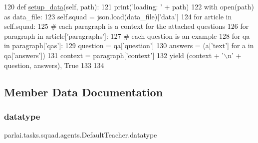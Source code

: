 \begin{DoxyCode}
120     \textcolor{keyword}{def }\hyperlink{namespaceparlai_1_1tasks_1_1multinli_1_1agents_a4fa2cb0ba1ed745336ad8bceed36b841}{setup\_data}(self, path):
121         print(\textcolor{stringliteral}{'loading: '} + path)
122         with open(path) \textcolor{keyword}{as} data\_file:
123             self.squad = json.load(data\_file)[\textcolor{stringliteral}{'data'}]
124         \textcolor{keywordflow}{for} article \textcolor{keywordflow}{in} self.squad:
125             \textcolor{comment}{# each paragraph is a context for the attached questions}
126             \textcolor{keywordflow}{for} paragraph \textcolor{keywordflow}{in} article[\textcolor{stringliteral}{'paragraphs'}]:
127                 \textcolor{comment}{# each question is an example}
128                 \textcolor{keywordflow}{for} qa \textcolor{keywordflow}{in} paragraph[\textcolor{stringliteral}{'qas'}]:
129                     question = qa[\textcolor{stringliteral}{'question'}]
130                     answers = (a[\textcolor{stringliteral}{'text'}] \textcolor{keywordflow}{for} a \textcolor{keywordflow}{in} qa[\textcolor{stringliteral}{'answers'}])
131                     context = paragraph[\textcolor{stringliteral}{'context'}]
132                     \textcolor{keywordflow}{yield} (context + \textcolor{stringliteral}{'\(\backslash\)n'} + question, answers), \textcolor{keyword}{True}
133 
134 
\end{DoxyCode}


\subsection{Member Data Documentation}
\mbox{\label{classparlai_1_1tasks_1_1squad_1_1agents_1_1DefaultTeacher_acad2f2d6c14f5bb2b990a8262dd6fa31}} 
\subsubsection{\texorpdfstring{datatype}{datatype}}
{\footnotesize\ttfamily parlai.\+tasks.\+squad.\+agents.\+Default\+Teacher.\+datatype}



